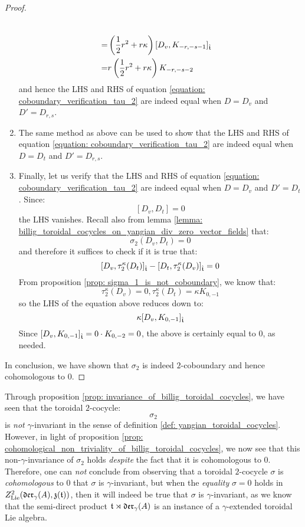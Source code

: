 \begin{proof}
\begin{enumerate}
$$\begin{aligned}
                                \\
                                = & \left(\frac12 r^2 + r \kappa \right)[D_v, K_{-r, -s - 1}]_{\hat{\mathfrak{t}}}
                                \\
                                = & r \left(\frac12 r^2 + r \kappa \right) K_{-r, -s - 2}
                            \end{aligned}
                        $$
                    and hence the LHS and RHS of equation \eqref{equation: coboundary_verification_tau_2} are indeed equal when $D = D_v$ and $D' = D_{r, s}$.
                    \item The same method as above can be used to show that the LHS and RHS of equation \eqref{equation: coboundary_verification_tau_2} are indeed equal when $D = D_t$ and $D' = D_{r, s}$.
                    \item Finally, let us verify that the LHS and RHS of equation \eqref{equation: coboundary_verification_tau_2} are indeed equal when $D = D_v$ and $D' = D_t$. Since:
                        $$[D_v, D_t] = 0$$
                    the LHS vanishes. Recall also from lemma \ref{lemma: billig_toroidal_cocycles_on_yangian_div_zero_vector_fields} that:
                        $$\sigma_2(D_v, D_t) = 0$$
                    and therefore it suffices to check if it is true that:
                        $$[D_v, \tau_2^{\kappa}(D_t)]_{\hat{\mathfrak{t}}} - [D_t, \tau_2^{\kappa}(D_v)]_{\hat{\mathfrak{t}}} = 0$$
                    From proposition \ref{prop: sigma_1_is_not_coboundary}, we know that:
                        $$\tau_2^{\kappa}(D_v) = 0, \tau_2^{\kappa}(D_t) = \kappa K_{0, -1}$$
                    so the LHS of the equation above reduces down to:
                        $$\kappa [D_v, K_{0, -1}]_{\hat{\mathfrak{t}}}$$
                    Since $[D_v, K_{0, -1}]_{\hat{\mathfrak{t}}} = 0 \cdot K_{0, -2} = 0$, the above is certainly equal to $0$, as needed.
                \end{enumerate}
                In conclusion, we have shown that $\sigma_2$ is indeed $2$-coboundary and hence cohomologous to $0$.
            \end{proof}
        \begin{remark}
            Through proposition \ref{prop: invariance_of_billig_toroidal_cocycles}, we have seen that the toroidal $2$-cocycle:
                $$\sigma_2$$
            is \textit{not} $\gamma$-invariant in the sense of definition \ref{def: yangian_toroidal_cocycles}. However, in light of proposition \ref{prop: cohomological_non_triviality_of_billig_toroidal_cocycles}, we now see that this non-$\gamma$-invariance of $\sigma_2$ holds \textit{despite} the fact that it is cohomologous to $0$. Therefore, one can \textit{not} conclude from observing that a toroidal $2$-cocycle $\sigma$ is \textit{cohomologous} to $0$ that $\sigma$ is $\gamma$-invariant, but when the \textit{equality} $\sigma = 0$ holds in $Z^2_{\mathrm{Lie}}(\mathfrak{der}_{\gamma}(A), \mathfrak{z}(\mathfrak{t}))$, then it will indeed be true that $\sigma$ is $\gamma$-invariant, as we know that the semi-direct product $\mathfrak{t} \rtimes \mathfrak{der}_{\gamma}(A)$ is an instance of a $\gamma$-extended toroidal Lie algebra.
        \end{remark}
